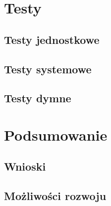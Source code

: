 \documentclass[eng,printmode,openany]{mgr}
\begin{document}
\newpage
\chapter{Testy}
\section{Testy jednostkowe}
\section{Testy systemowe}
\section{Testy dymne}
\newpage
\chapter{Podsumowanie}
\section{Wnioski}
\section{Możliwości rozwoju}

\end{document}

